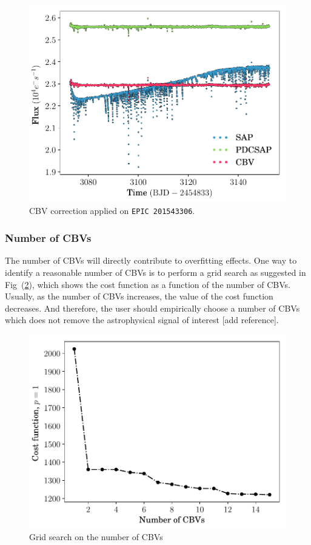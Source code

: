 \documentclass{article}
\begin{document}
\begin{figure}[!htb]
    \centering
    \includegraphics[scale=.5]{figs/cbv-k2.pdf}
    \caption{CBV correction applied on \texttt{EPIC 201543306}.}
    \label{fig:cbv-correction-k2}
\end{figure}

\subsubsection{Number of CBVs}
The number of CBVs will directly contribute to overfitting effects. One
way to identify a reasonable number of CBVs is to perform a grid search
as suggested in Fig~(\ref{fig:cbv-grid-search}), which shows the cost
function as a function of the number of CBVs. Usually, as the number of
CBVs increases, the value of the cost function decreases. And therefore,
the user should empirically choose a number of CBVs which does not
remove the astrophysical signal of interest [add reference].

\begin{figure}[!htb]
    \centering
    \includegraphics[scale=.5]{figs/cbv-grid-search.pdf}
    \caption{Grid search on the number of CBVs}
    \label{fig:cbv-grid-search}
\end{figure}
\end{document}
